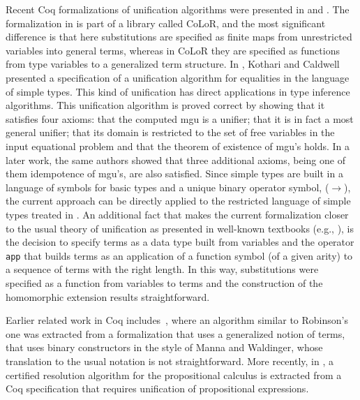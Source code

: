 \documentclass[submission,copyright,creativecommons]{eptcs}
\begin{document}
  Recent Coq formalizations of unification algorithms were presented
  in \cite{BlKo2011} and \cite{KoCa2009}. The formalization in
  \cite{BlKo2011} is part of a library called CoLoR, and the most
  significant difference is that here substitutions are specified as
  finite maps from unrestricted variables into general terms, whereas
  in CoLoR they are specified as functions from type variables to a
  generalized term structure.  In \cite{KoCa2009}, Kothari and
  Caldwell presented a specification of a unification algorithm for
  equalities in the language of simple types. This kind of unification
  has direct applications in type inference algorithms. This
  unification algorithm is proved correct by showing that it satisfies
  four axioms: that the computed mgu is a unifier; that it is in fact
  a most general unifier; that its domain is restricted to the set of
  free variables in the input equational problem and that the theorem
  of existence of mgu's holds. In a later work, the same authors
  showed that three additional axioms, being one of them idempotence
  of mgu's, are also satisfied. Since simple types are built in a
  language of symbols for basic types and a unique binary operator
  symbol, ($\to$), the current approach can be directly applied to the
  restricted language of simple types treated in \cite{KoCa2009}.  An
  additional fact that makes the current formalization closer to the
  usual theory of unification as presented in well-known textbooks
  (e.g., \cite{Llo87, BaNi98}), is the decision to specify terms as a
  data type built from variables and the operator {\tt app} that
  builds terms as an application of a function symbol (of a given
  arity) to a sequence of terms with the right length. In this way,
  substitutions were specified as a function from variables to terms
  and the construction of the homomorphic extension results
  straightforward.

  Earlier related work in Coq includes~\cite{Rou1992}, where an
  algorithm similar to Robinson's one was extracted from a
  formalization that uses a generalized notion of terms, that uses
  binary constructors in the style of Manna and Waldinger, whose
  translation to the usual notation is not straightforward. More
  recently, in \cite{Constable09}, a certified resolution algorithm
  for the propositional calculus is extracted from a Coq specification
  that requires unification of propositional expressions.
\end{document}
